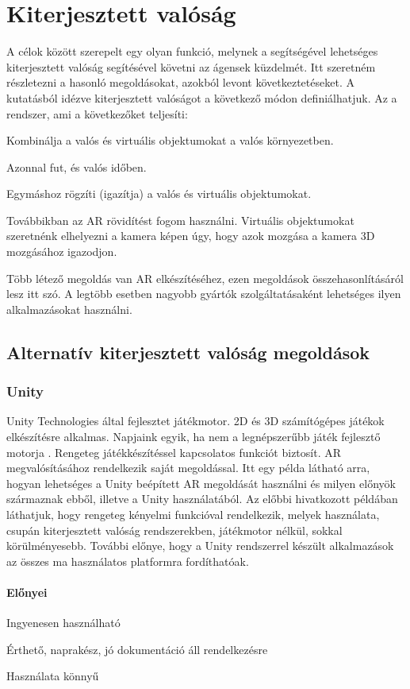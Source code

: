 \documentclass[12pt,a4paper,oneside]{report} %
\begin{document}
\section{Kiterjesztett valóság}
\label{kitvalo}
A célok között szerepelt egy olyan funkció, melynek a segítségével lehetséges kiterjesztett valóság segítésével követni az ágensek küzdelmét. Itt szeretném részletezni a hasonló megoldásokat, azokból levont következtetéseket.
A \cite{azuma2001recent} kutatásból idézve  kiterjesztett valóságot a következő módon definiálhatjuk. Az a rendszer, ami a következőket teljesíti:
\begin{compactitem}
	\item Kombinálja a valós és virtuális objektumokat a valós környezetben.
	\item Azonnal fut, és valós időben.
	\item Egymáshoz rögzíti (igazítja) a valós és virtuális objektumokat.
\end{compactitem}
Továbbikban az AR rövidítést fogom használni. 
Virtuális objektumokat szeretnénk elhelyezni a kamera képen úgy, hogy azok mozgása a kamera 3D mozgásához igazodjon. 
\par Több létező megoldás van AR elkészítéséhez, ezen megoldások összehasonlításáról lesz itt szó.
A legtöbb esetben nagyobb gyártók szolgáltatásaként lehetséges ilyen alkalmazásokat használni.
\subsection{Alternatív kiterjesztett valóság megoldások}
\label{kitval}
\subsubsection{Unity}
Unity Technologies által fejlesztet játékmotor. 2D és 3D számítógépes játékok elkészítésre alkalmas. Napjaink egyik, ha nem a legnépszerűbb játék fejlesztő motorja \cite{haas2014history}.
Rengeteg játékkészítéssel kapcsolatos funkciót biztosít. AR megvalósításához rendelkezik saját megoldással. Itt \cite{kim2014using} egy példa látható arra, hogyan lehetséges a Unity beépített AR megoldását használni és milyen előnyök származnak ebből, illetve a Unity használatából. Az előbbi hivatkozott példában láthatjuk, hogy rengeteg kényelmi funkcióval rendelkezik, melyek használata, csupán kiterjesztett valóság rendszerekben, játékmotor nélkül, sokkal körülményesebb.  További előnye, hogy a Unity rendszerrel készült alkalmazások az összes ma használatos platformra fordíthatóak. 
\paragraph{Előnyei} 
\begin{compactitem}
	\item Ingyenesen használható
	\item Érthető, naprakész, jó dokumentáció áll rendelkezésre
	\item Használata könnyű
\end{compactitem}
\end{document}
